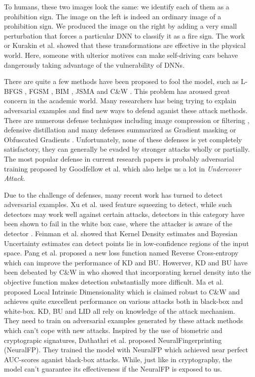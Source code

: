 \documentclass{article}
\begin{document}
To humans, these two images look the same: we identify each of them as a prohibition sign. The image on the left is indeed an ordinary image of a prohibition sign. We produced the image on the right by adding a very small perturbation that forces a particular DNN to classify it as a fire sign. The work or Kurakin et al. \cite{Kurakin2016Adversarial} showed that these transformations are effective in the physical world. Here, someone with ulterior motives can make self-driving cars behave dangerously taking advantage of the vulnerability of DNNs.

There are quite a few methods have been proposed to fool the model, such as L-BFGS \cite{Szegedy2013Intriguing}, FGSM \cite{Goodfellow2014Explaining}, BIM \cite{Kurakin2016Adversarial}, JSMA \cite{papernot2016the} and C\&W \cite{Carlini2016Towards}. This problem has aroused great concern in the academic world. Many researchers has being trying to explain adversarial examples and find new ways to defend aganist these attack methods. There are numerous defense techniques including image compression or filtering \cite{das2017keeping,xu2018feature}, defensive distillation \cite{papernot2016distillation} and many defenses summarized as Gradient masking \cite{Papernot2016Transferability} or Obfuscated Gradients \cite{athalye2018obfuscated}. Unfortunately, none of these defenses is yet completely satisfactory, they can generally be evaded by stronger attacks wholly or partially. The most popular defense in current research papers is probably adversarial training proposed by Goodfellow et al. \cite{Goodfellow2014Explaining} which also helps us a lot in \emph{Undercover Attack}.

Due to the challenge of defenses, many recent work has turned to detect adversarial examples. Xu et al. used feature squeezing to detect, while such detectors may work well against certain attacks, detectors in this category have been shown to fail in the white box case, where the attacker is aware of the detector \cite{He2017Adversarial}. Feinman et al. \cite{feinman2017detecting} showed that Kernel Density estimates and Bayesian Uncertainty estimates can detect points lie in low-confidence regions of the input space. Pang et al. \cite{pang2018towards} proposed a new loss function named Reverse Cross-entropy which can improve the performance of KD and BU. Howerver, KD and BU have been debeated by C\&W in \cite{carlini2017adversarial} who showed that incorporating kernel density into the objective function makes detection substantially more difficult. Ma et al. \cite{ma2018characterizing} proposed Local Intrinsic Dimensionality which is claimed robust to C\&W and achieves quite execellent performance on various attacks both in black-box and white-box. KD, BU and LID all rely on knowledge of the attack mechanism. They need to train on adversarial examples generated by these attack methods which can't cope with new attacks. Inspired by the use of biometric and cryptograpic signatures, Dathathri et al. \cite{dathathri2018detecting} proposed NeuralFingerprinting (NeuralFP). They trained the model with NeuralFP which achieved near perfect AUC-scores aganist black-box attacks. While, just like in cryptography, the model can't guarantee its effectiveness if the NeuralFP is exposed to us.
\end{document}
